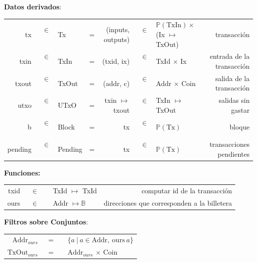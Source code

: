 \documentclass[12pt]{book}
\begin{document}
\textbf{Datos derivados}:

\begin{center}
	\begin{tabular}{ r @{} c @{} l c r @{} c @{} l r}
		tx      & \ $\in$\ \  & Tx      & = & (inputs, outputs)    & \ $\in$\ \  & $\mathbb{P}(\text{TxIn}) \times$ (Ix $\mapsto$ TxOut) & transacción               \\
		txin    & \ $\in$\ \  & TxIn    & = & (txid, ix)           & \ $\in$\ \  & TxId $\times$ Ix                                      & entrada de la transacción \\
		txout   & \ $\in$\ \  & TxOut   & = & (addr, c)            & \ $\in$\ \  & Addr $\times$ Coin                                    & salida de la transacción  \\
		utxo    & \ $\in$\ \  & UTxO    & = & txin $\mapsto$ txout & \ $\in$\ \  & TxIn $\mapsto$ TxOut                                  & salidas sin gastar        \\
		b       & \ $\in$\ \  & Block   & = & tx                   & \ $\in$\ \  & $\mathbb{P}(\text{Tx})$                               & bloque                    \\
		pending & \ $\in$\ \  & Pending & = & tx                   & \ $\in$\ \  & $\mathbb{P}(\text{Tx})$                               & transacciones pendientes
	\end{tabular}
\end{center}

\textbf{Funciones:}

\begin{center}
	\begin{tabular}{ r @{} c @{} l r }
		txid & \ $\in$\ \  & TxId $\mapsto$ TxId       & computar id de la transacción               \\
		ours & \ $\in$\ \  & Addr $\mapsto \mathbb{B}$ & direcciones que corresponden a la billetera \\
	\end{tabular}
\end{center}

\textbf{Filtros sobre Conjuntos}:

\begin{center}
	\begin{tabular}{ r @{} c @{} l}
		$\text{Addr}_{ours}$  & \ =\ \  & $\{a\ |\ a \in \text{Addr},\ \text{ours}\ a\}$ \\
		$\text{TxOut}_{ours}$ & \ =\ \  & $\text{Addr}_{ours}$ $\times$ Coin             \\
	\end{tabular}
\end{center}
\end{document}
